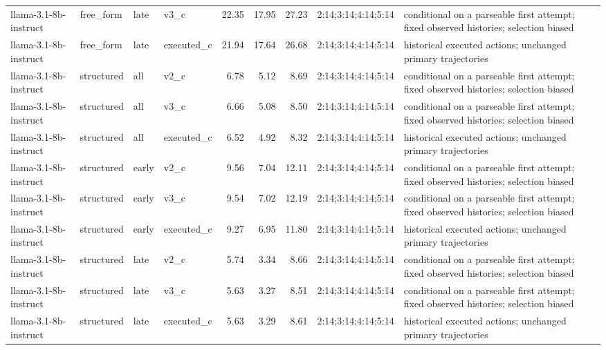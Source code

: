 \begin{tabular}{llllrrrll}
llama-3.1-8b-instruct & free\_form & late & v3\_c & 22.35 & 17.95 & 27.23 & 2:14;3:14;4:14;5:14 & conditional on a parseable first attempt; fixed observed histories; selection biased \\
llama-3.1-8b-instruct & free\_form & late & executed\_c & 21.94 & 17.64 & 26.68 & 2:14;3:14;4:14;5:14 & historical executed actions; unchanged primary trajectories \\
llama-3.1-8b-instruct & structured & all & v2\_c & 6.78 & 5.12 & 8.69 & 2:14;3:14;4:14;5:14 & conditional on a parseable first attempt; fixed observed histories; selection biased \\
llama-3.1-8b-instruct & structured & all & v3\_c & 6.66 & 5.08 & 8.50 & 2:14;3:14;4:14;5:14 & conditional on a parseable first attempt; fixed observed histories; selection biased \\
llama-3.1-8b-instruct & structured & all & executed\_c & 6.52 & 4.92 & 8.32 & 2:14;3:14;4:14;5:14 & historical executed actions; unchanged primary trajectories \\
llama-3.1-8b-instruct & structured & early & v2\_c & 9.56 & 7.04 & 12.11 & 2:14;3:14;4:14;5:14 & conditional on a parseable first attempt; fixed observed histories; selection biased \\
llama-3.1-8b-instruct & structured & early & v3\_c & 9.54 & 7.02 & 12.19 & 2:14;3:14;4:14;5:14 & conditional on a parseable first attempt; fixed observed histories; selection biased \\
llama-3.1-8b-instruct & structured & early & executed\_c & 9.27 & 6.95 & 11.80 & 2:14;3:14;4:14;5:14 & historical executed actions; unchanged primary trajectories \\
llama-3.1-8b-instruct & structured & late & v2\_c & 5.74 & 3.34 & 8.66 & 2:14;3:14;4:14;5:14 & conditional on a parseable first attempt; fixed observed histories; selection biased \\
llama-3.1-8b-instruct & structured & late & v3\_c & 5.63 & 3.27 & 8.51 & 2:14;3:14;4:14;5:14 & conditional on a parseable first attempt; fixed observed histories; selection biased \\
llama-3.1-8b-instruct & structured & late & executed\_c & 5.63 & 3.29 & 8.61 & 2:14;3:14;4:14;5:14 & historical executed actions; unchanged primary trajectories \\
\bottomrule
\end{tabular}
